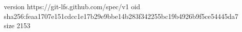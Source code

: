 version https://git-lfs.github.com/spec/v1
oid sha256:feaa1707e151cdcc1e17b29e9bbe14b283f342255bc19b4926b9f5ce54445da7
size 2153
